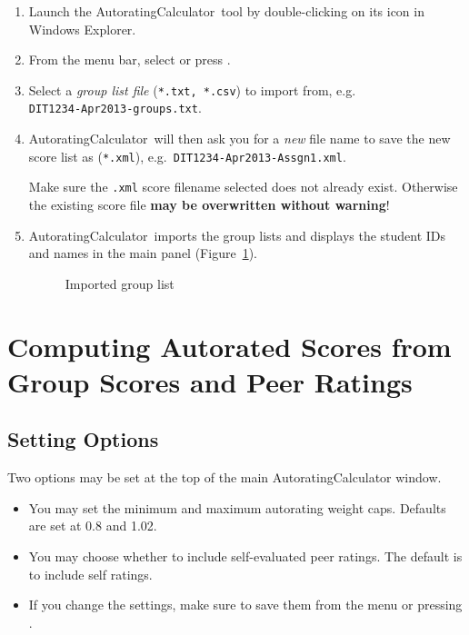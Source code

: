 \documentclass[a4paper,11pt]{refart}
\newcommand\AutoCalc{\textsf{AutoratingCalculator}}
\begin{document}
	\begin{enumerate}
		\item Launch the \AutoCalc\ tool by double-clicking on its icon in Windows Explorer.
		\item From the menu bar, select  or press .
		\item Select a \emph{group list file} (\texttt{*.txt, *.csv}) to import from, e.g.\\\texttt{DIT1234-Apr2013-groups.txt}.
		\item \AutoCalc\ will then ask you for a \emph{new} file name to save the new score list as (\texttt{*.xml}), e.g.~\texttt{DIT1234-Apr2013-Assgn1.xml}.
		
		
		\medskip
		
		\begin{leftbar}
			Make sure the \texttt{.xml} score filename selected does not already exist. Otherwise the existing score file \textbf{may be overwritten without warning}!
		\end{leftbar}
		
		\medskip
		
		\item \AutoCalc\ imports the group lists and displays the student IDs and names in the main panel (Figure~\ref{fig:grouplist}).
		
		\begin{figure}[hbt!]\centering
			\caption{Imported group list}\label{fig:grouplist}
		\end{figure}
	\end{enumerate}
	
	\section{Computing Autorated Scores from Group Scores and Peer Ratings}
	
	\subsection{Setting Options}
	
	Two options may be set at the top of the main \AutoCalc{} window.
	
	\begin{itemize}
		\item You may set the minimum and maximum autorating weight caps. Defaults are set at 0.8 and 1.02.
		
		\item You may choose whether to include self-evaluated peer ratings. The default is to include self ratings.
		
		\item If you change the settings, make sure to save them from the menu  or pressing .
	\end{itemize}
	
\end{document}
